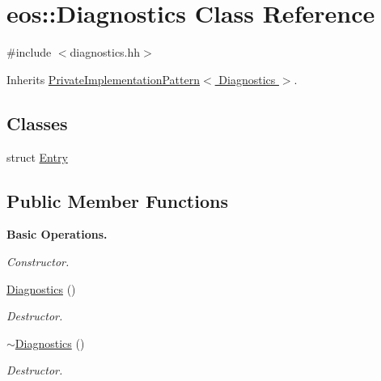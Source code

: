 \hypertarget{classeos_1_1Diagnostics}{
\section{eos::Diagnostics Class Reference}
\label{classeos_1_1Diagnostics}
}


{\ttfamily \#include $<$diagnostics.hh$>$}

Inherits \hyperlink{classeos_1_1PrivateImplementationPattern}{PrivateImplementationPattern$<$ Diagnostics $>$}.\subsection*{Classes}
\begin{DoxyCompactItemize}
\item 
struct \hyperlink{structeos_1_1Diagnostics_1_1Entry}{Entry}
\end{DoxyCompactItemize}
\subsection*{Public Member Functions}
\begin{Indent}{\bf Basic Operations.}\par
{\em \label{_amgrp640cb1fd388fd2cb0293189fe884d421}
 Constructor. }\begin{DoxyCompactItemize}
\item 
\hyperlink{classeos_1_1Diagnostics_aeff0c4ba0db58891ead8bc4e5a17d075}{Diagnostics} ()
\begin{DoxyCompactList}\small\item\em Destructor. \item\end{DoxyCompactList}\item 
\hyperlink{classeos_1_1Diagnostics_a95753f31bc63bad2b51b8699be04f01d}{$\sim$Diagnostics} ()
\begin{DoxyCompactList}\small\item\em Destructor. \item\end{DoxyCompactList}\end{DoxyCompactItemize}
\end{Indent}
